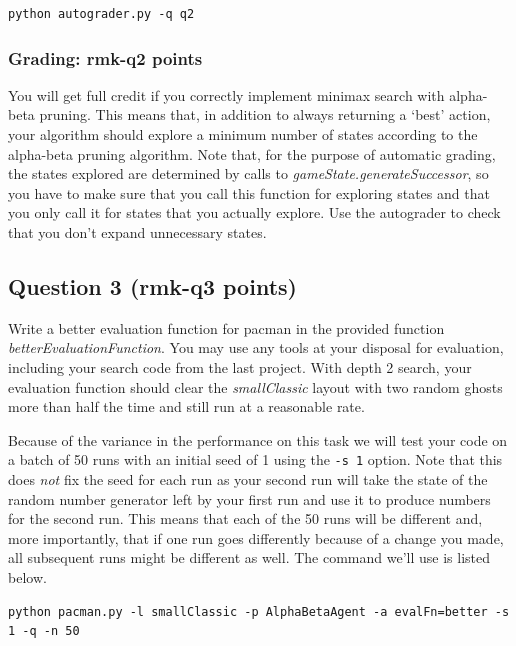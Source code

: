 \documentclass{article}
\newcommand{\points}[1]{\csname rmk-#1\endcsname}
\begin{document}
\begin{verbatim}
python autograder.py -q q2
\end{verbatim}

\subsubsection{Grading: \points{q2} points}
You will get full credit if you correctly implement minimax search with alpha-beta pruning. This means that, in addition to always returning a `best' action, your algorithm should explore a minimum number of states according to the alpha-beta pruning algorithm. Note that, for the purpose of automatic grading, the states explored are determined by calls to \emph{gameState.generateSuccessor}, so you have to make sure that you call this function for exploring states and that you only call it for states that you actually explore. Use the autograder to check that you don't expand unnecessary states.



\subsection{Question 3 (\points{q3} points)} 
Write a better evaluation function for pacman in the provided function \emph{betterEvaluationFunction}. You may use any tools at your disposal for evaluation, including your search code from the last project. With depth 2 search, your evaluation function should clear the \emph{smallClassic} layout with two random ghosts more than half the time and still run at a reasonable rate.

Because of the variance in the performance on this task we will test your code on a batch of 50 runs with an initial seed of 1 using the \texttt{-s 1} option. Note that this does \emph{not} fix the seed for each run as your second run will take the state of the random number generator left by your first run and use it to produce numbers for the second run. This means that each of the 50 runs will be different and, more importantly, that if one run goes differently because of a change you made, all subsequent runs might be different as well. The command we'll use is listed below.

\begin{footnotesize}
\begin{verbatim}
python pacman.py -l smallClassic -p AlphaBetaAgent -a evalFn=better -s 1 -q -n 50
\end{verbatim}
\end{footnotesize}
\end{document}
